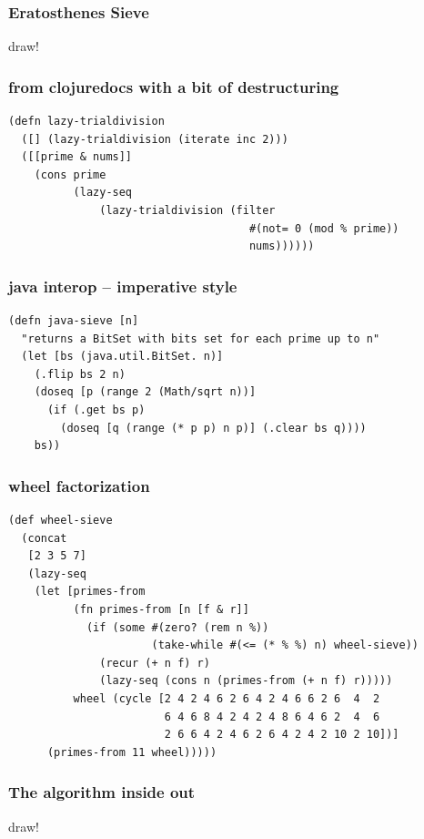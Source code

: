 \documentclass{beamer}
\begin{document}
\begin{frame}\frametitle{Eratosthenes Sieve}
draw!
\end{frame}

\begin{frame}[fragile]
\frametitle{from clojuredocs with a bit of destructuring}
\begin{verbatim}
(defn lazy-trialdivision
  ([] (lazy-trialdivision (iterate inc 2)))
  ([[prime & nums]]
    (cons prime
          (lazy-seq
              (lazy-trialdivision (filter
                                     #(not= 0 (mod % prime))
                                     nums))))))
\end{verbatim}

\end{frame}

\begin{frame}[fragile]
\frametitle{java interop -- imperative style}
\begin{verbatim}
(defn java-sieve [n]
  "returns a BitSet with bits set for each prime up to n"
  (let [bs (java.util.BitSet. n)]
    (.flip bs 2 n)
    (doseq [p (range 2 (Math/sqrt n))]
      (if (.get bs p)
        (doseq [q (range (* p p) n p)] (.clear bs q))))
    bs))
\end{verbatim}

\end{frame}

\begin{frame}[fragile]
\frametitle{wheel factorization}
\begin{verbatim}
(def wheel-sieve
  (concat
   [2 3 5 7]
   (lazy-seq
    (let [primes-from
          (fn primes-from [n [f & r]]
            (if (some #(zero? (rem n %))
                      (take-while #(<= (* % %) n) wheel-sieve))
              (recur (+ n f) r)
              (lazy-seq (cons n (primes-from (+ n f) r)))))
          wheel (cycle [2 4 2 4 6 2 6 4 2 4 6 6 2 6  4  2
                        6 4 6 8 4 2 4 2 4 8 6 4 6 2  4  6
                        2 6 6 4 2 4 6 2 6 4 2 4 2 10 2 10])]
      (primes-from 11 wheel)))))
\end{verbatim}
\end{frame}


\begin{frame}\frametitle{The algorithm inside out}
draw!
\end{frame}
\end{document}
